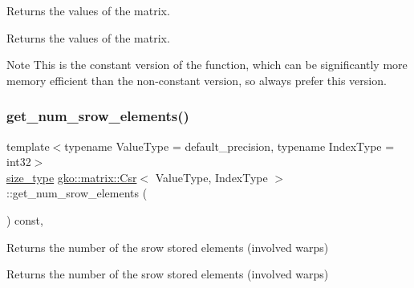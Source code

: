 Returns the values of the matrix. 

\begin{DoxyReturn}{Returns}
the values of the matrix.
\end{DoxyReturn}
\begin{DoxyNote}{Note}
This is the constant version of the function, which can be significantly more memory efficient than the non-\/constant version, so always prefer this version. 
\end{DoxyNote}
\mbox{\label{classgko_1_1matrix_1_1Csr_a5b8c25c2fb1bbea62a3afdec8f8340c5}} 
\subsubsection{\texorpdfstring{get\+\_\+num\+\_\+srow\+\_\+elements()}{get\_num\_srow\_elements()}}
{\footnotesize\ttfamily template$<$typename Value\+Type = default\+\_\+precision, typename Index\+Type = int32$>$ \\
\hyperlink{namespacegko_a6e5c95df0ae4e47aab2f604a22d98ee7}{size\+\_\+type} \hyperlink{classgko_1_1matrix_1_1Csr}{gko\+::matrix\+::\+Csr}$<$ Value\+Type, Index\+Type $>$\+::get\+\_\+num\+\_\+srow\+\_\+elements (\begin{DoxyParamCaption}{ }\end{DoxyParamCaption}) const\hspace{0.3cm}{\ttfamily [inline]}, {\ttfamily [noexcept]}}



Returns the number of the srow stored elements (involved warps) 

\begin{DoxyReturn}{Returns}
the number of the srow stored elements (involved warps) 
\end{DoxyReturn}
\mbox{\label{classgko_1_1matrix_1_1Csr_ab70c085fc3df11a4ed9fe74b40844c5c}} 
